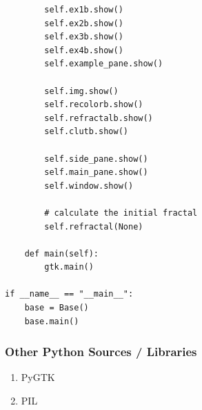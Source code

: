 \documentclass{article}
\begin{document}
\begin{lstlisting}
        self.ex1b.show()
        self.ex2b.show()
        self.ex3b.show()
        self.ex4b.show()
        self.example_pane.show()

        self.img.show()
        self.recolorb.show()
        self.refractalb.show()
        self.clutb.show()

        self.side_pane.show()
        self.main_pane.show()
        self.window.show()

        # calculate the initial fractal
        self.refractal(None)

    def main(self):
        gtk.main()

if __name__ == "__main__":
    base = Base()
    base.main()
\end{lstlisting}

\subsubsection{Other Python Sources / Libraries}
\begin{enumerate}{}
\item PyGTK
\item PIL
\end{enumerate}
\end{document}
